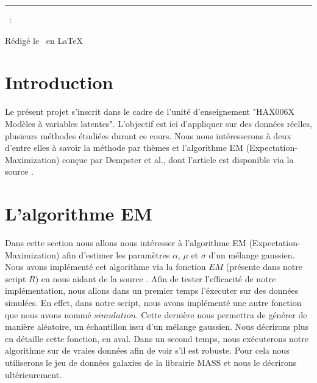 \documentclass[a4paper,french,10pt]{article}
\begin{document}
	
	\title{\vspace{-1in}} %
	\author{} %
	\date{} %
	\maketitle %
	
	\usebox{\myReportTitle}
	\vspace{1in} %
	
	{\centering \huge \assignmentName \par}
	{\centering \noindent\rule{4in}{0.1pt} \par}
	\vspace{0.05in}
	{\centering \courseCode~: \courseName~ \par}
	{\centering Rédigé le \pubDate\ en \LaTeX \par}
	\vspace{1in}
	
	\tableofcontents
	\newpage
	
	

\section{Introduction}
Le présent projet s'inscrit dans le cadre de l'unité d'enseignement "HAX006X Modèles à variables latentes". L'objectif est ici d'appliquer sur des données réelles, plusieurs méthodes étudiées durant ce cours. Nous nous intéresserons à deux d'entre elles à savoir la méthode par thèmes et  l'algorithme EM (Expectation-Maximization) conçue par Dempster et al., dont l'article est disponible via la source \cite{article}.

\newpage

\section{L'algorithme EM}
Dans cette section nous allons nous intéresser à l'algorithme EM (Expectation-Maximization) afin d'estimer les paramètres $\alpha$, $\mu$ et $\sigma$ d'un mélange gaussien. Nous avons implémenté cet algorithme via la fonction $EM$ (présente dans notre script $R$) en nous aidant de la source \cite{EM_algorithm}. Afin de tester l'efficacité de notre implémentation, nous allons dans un premier temps l'éxecuter sur des données simulées. En effet, dans notre script, nous avons implémenté une autre fonction que nous avons nommé $simulation$. Cette dernière nous permettra de générer de manière aléatoire, un échantillon issu d'un mélange gaussien. Nous décrirons plus en détaille cette fonction, en aval. Dans un second temps, nous exécuterons notre algorithme sur de vraies données afin de voir s'il est robuste. Pour cela nous utiliserons le jeu de données galaxies de la librairie MASS et nous le décrirons ultérieurement.
\end{document}
